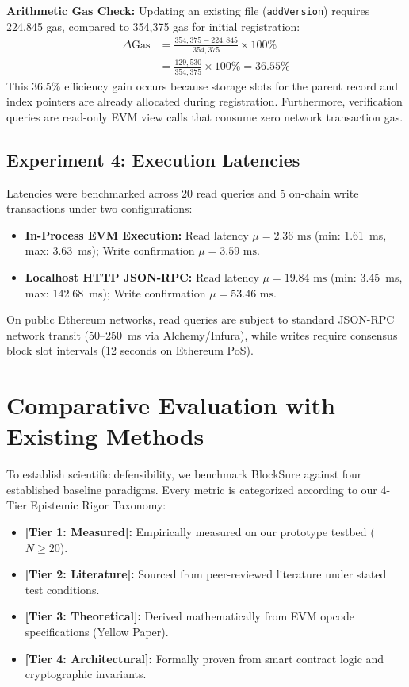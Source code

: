 \documentclass[10pt,conference,letterpaper]{IEEEtran}
\begin{document}
\textbf{Arithmetic Gas Check:} Updating an existing file (\texttt{addVersion}) requires 224,845 gas, compared to 354,375 gas for initial registration:
\begin{equation}
\begin{aligned}
\Delta\text{Gas} &= \frac{354{,}375 - 224{,}845}{354{,}375} \times 100\% \\
&= \frac{129{,}530}{354{,}375} \times 100\% = 36.55\%
\end{aligned}
\end{equation}
This 36.5\% efficiency gain occurs because storage slots for the parent record and index pointers are already allocated during registration. Furthermore, verification queries are read-only EVM view calls that consume zero network transaction gas.

\subsection{Experiment 4: Execution Latencies}
Latencies were benchmarked across 20 read queries and 5 on-chain write transactions under two configurations:
\begin{itemize}
    \item \textbf{In-Process EVM Execution:} Read latency $\mu = 2.36\text{ ms}$ (min: 1.61~ms, max: 3.63~ms); Write confirmation $\mu = 3.59\text{ ms}$.
    \item \textbf{Localhost HTTP JSON-RPC:} Read latency $\mu = 19.84\text{ ms}$ (min: 3.45~ms, max: 142.68~ms); Write confirmation $\mu = 53.46\text{ ms}$.
\end{itemize}
On public Ethereum networks, read queries are subject to standard JSON-RPC network transit (50--250~ms via Alchemy/Infura), while writes require consensus block slot intervals (12 seconds on Ethereum PoS).

\section{Comparative Evaluation with Existing Methods}
To establish scientific defensibility, we benchmark BlockSure against four established baseline paradigms. Every metric is categorized according to our 4-Tier Epistemic Rigor Taxonomy:
\begin{itemize}
    \item \textbf{[Tier 1: Measured]:} Empirically measured on our prototype testbed ($N \ge 20$).
    \item \textbf{[Tier 2: Literature]:} Sourced from peer-reviewed literature under stated test conditions.
    \item \textbf{[Tier 3: Theoretical]:} Derived mathematically from EVM opcode specifications (Yellow Paper).
    \item \textbf{[Tier 4: Architectural]:} Formally proven from smart contract logic and cryptographic invariants.
\end{itemize}
\end{document}
